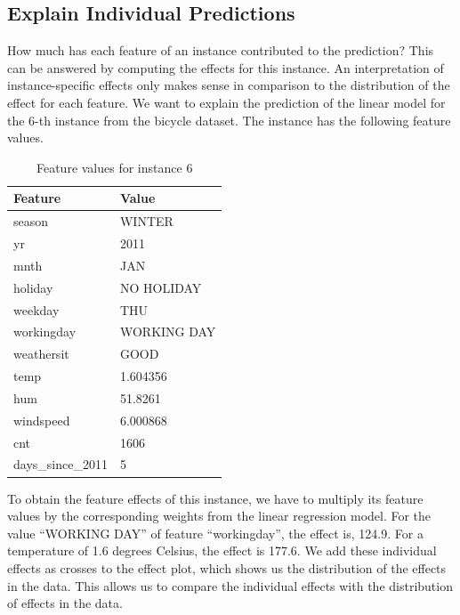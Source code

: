 \documentclass[
  10pt,
]{scrbook}
\begin{document}
\hypertarget{explain-individual-predictions}{%
\subsection{Explain Individual Predictions}\label{explain-individual-predictions}}

How much has each feature of an instance contributed to the prediction?
This can be answered by computing the effects for this instance.
An interpretation of instance-specific effects only makes sense in comparison to the distribution of the effect for each feature.
We want to explain the prediction of the linear model for the 6-th instance from the bicycle dataset.
The instance has the following feature values.

\begin{table}

\caption{\label{tab:linear-effects-single-table}Feature values for instance 6}
\centering
\begin{tabular}[t]{ll}
\toprule
Feature & Value\\
\midrule
season & WINTER\\
yr & 2011\\
mnth & JAN\\
holiday & NO HOLIDAY\\
weekday & THU\\
\addlinespace
workingday & WORKING DAY\\
weathersit & GOOD\\
temp & 1.604356\\
hum & 51.8261\\
windspeed & 6.000868\\
\addlinespace
cnt & 1606\\
days\_since\_2011 & 5\\
\bottomrule
\end{tabular}
\end{table}

To obtain the feature effects of this instance, we have to multiply its feature values by the corresponding weights from the linear regression model.
For the value ``WORKING DAY'' of feature ``workingday'', the effect is, 124.9.
For a temperature of 1.6 degrees Celsius, the effect is 177.6.
We add these individual effects as crosses to the effect plot, which shows us the distribution of the effects in the data.
This allows us to compare the individual effects with the distribution of effects in the data.
\end{document}
